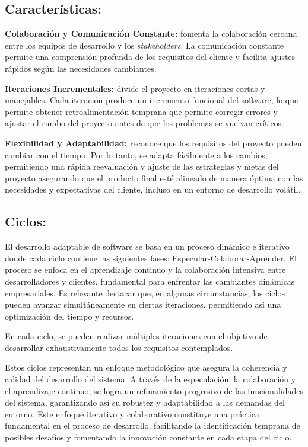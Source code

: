 \documentclass[
  12pt,
  openany]{book}
\begin{document}
\hypertarget{caracteruxedsticas}{%
\subsection{Características:}\label{caracteruxedsticas}}

\textbf{Colaboración y Comunicación Constante:} fomenta la colaboración cercana entre los equipos de desarrollo y los \emph{stakeholders}. La comunicación constante permite una comprensión profunda de los requisitos del cliente y facilita ajustes rápidos según las necesidades cambiantes.

\textbf{Iteraciones Incrementales:} divide el proyecto en iteraciones cortas y manejables. Cada iteración produce un incremento funcional del software, lo que permite obtener retroalimentación temprana que permite corregir errores y ajustar el rumbo del proyecto antes de que los problemas se vuelvan críticos.

\textbf{Flexibilidad y Adaptabilidad:} reconoce que los requisitos del proyecto pueden cambiar con el tiempo. Por lo tanto, se adapta fácilmente a los cambios, permitiendo una rápida reevaluación y ajuste de las estrategias y metas del proyecto asegurando que el producto final esté alineado de manera óptima con las necesidades y expectativas del cliente, incluso en un entorno de desarrollo volátil.

\hypertarget{ciclos}{%
\subsection{Ciclos:}\label{ciclos}}

El desarrollo adaptable de software se basa en un proceso dinámico e iterativo donde cada ciclo contiene las siguientes fases: Especular-Colaborar-Aprender. El proceso se enfoca en el aprendizaje continuo y la colaboración intensiva entre desarrolladores y clientes, fundamental para enfrentar las cambiantes dinámicas empresariales. Es relevante destacar que, en algunas circunstancias, los ciclos pueden avanzar simultáneamente en ciertas iteraciones, permitiendo así una optimización del tiempo y recursos.

En cada ciclo, se pueden realizar múltiples iteraciones con el objetivo de desarrollar exhaustivamente todos los requisitos contemplados.

Estos ciclos representan un enfoque metodológico que asegura la coherencia y calidad del desarrollo del sistema. A través de la especulación, la colaboración y el aprendizaje continuo, se logra un refinamiento progresivo de las funcionalidades del sistema, garantizando así su robustez y adaptabilidad a las demandas del entorno. Este enfoque iterativo y colaborativo constituye una práctica fundamental en el proceso de desarrollo, facilitando la identificación temprana de posibles desafíos y fomentando la innovación constante en cada etapa del ciclo.
\end{document}
